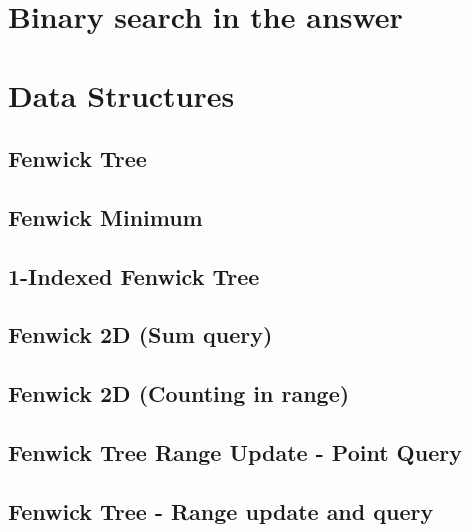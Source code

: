 \documentclass[10pt]{article}
\begin{document}
\begin{multicols*}{2}
\section{Binary search in the answer}

\section{Data Structures}
\subsection{Fenwick Tree}


\subsection{Fenwick Minimum}


\subsection{1-Indexed Fenwick Tree}


\subsection{Fenwick 2D (Sum query)}


\subsection{Fenwick 2D (Counting in range)}


\subsection{Fenwick Tree Range Update - Point Query}


\subsection{Fenwick Tree - Range update and query}



\end{multicols*}
\end{document}

